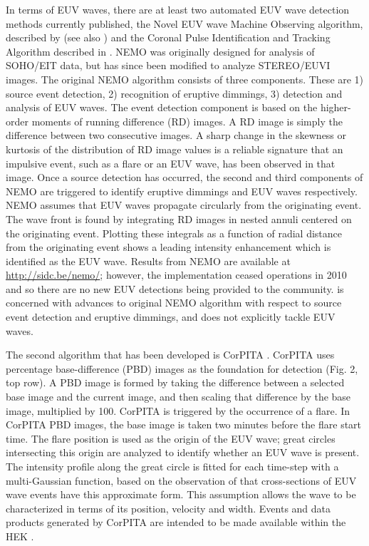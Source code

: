 In terms of EUV waves, there are at least two automated EUV wave detection methods currently
published, the Novel EUV wave Machine Observing algorithm, described
by \cite{2005SoPh..228..265P} (see also
\cite{2012SoPh..276..479P}) and the Coronal Pulse Identification and
Tracking Algorithm described in \cite{2014SoPh..289.3279L}. NEMO was originally designed for analysis of SOHO/EIT data, but has since been modified to analyze STEREO/EUVI images. The original NEMO algorithm \cite{2005SoPh..228..265P} consists of three
components. These are 1) source event detection, 2) recognition of
eruptive dimmings, 3) detection and analysis of EUV waves. The event
detection component is based on the higher-order moments of running
difference (RD) images. A RD image is simply the difference between
two consecutive images. A sharp change in the skewness or kurtosis of
the distribution of RD image values is a reliable signature that an
impulsive event, such as a flare or an EUV wave, has been observed in
that image. Once a source detection has occurred, the second and third
components of NEMO are triggered to identify eruptive dimmings and EUV
waves respectively.  NEMO assumes that EUV waves propagate circularly
from the originating event. The wave front is found by integrating RD
images in nested annuli centered on the originating event.  Plotting
these integrals as a function of radial distance from the originating
event shows a leading intensity enhancement which is identified as the
EUV wave.  Results from NEMO are available at
\url{http://sidc.be/nemo/}; however, the implementation ceased
operations in 2010 and so there are no new EUV detections being
provided to the community.  
\cite{2012SoPh..276..479P} is concerned with advances to original NEMO
algorithm with respect to source event detection and eruptive
dimmings, and does not explicitly tackle EUV waves.

The second algorithm that has been developed is CorPITA
\citep{2014SoPh..289.3279L}. CorPITA uses percentage base-difference
(PBD) images as the foundation for detection (Fig. 2, top row).  A PBD
image is formed by taking the difference between a selected base image
and the current image, and then scaling that difference by the base
image, multiplied by 100.  CorPITA is triggered by the occurrence of a
flare.  In CorPITA PBD images, the base image is taken two minutes
before the flare start time. The flare position is used as the origin
of the EUV wave; great circles intersecting this origin are analyzed
to identify whether an EUV wave is present. The intensity profile
along the great circle is fitted for each time-step with a
multi-Gaussian function, based on the observation of
\cite{2006ApJ...645..757W} that cross-sections of EUV wave events have
this approximate form. This assumption allows the wave to be
characterized in terms of its position, velocity and width. Events and
data products generated by CorPITA are intended to be made available
within the HEK \citep{hek2012, 2012SoPh..275...79M}.  

